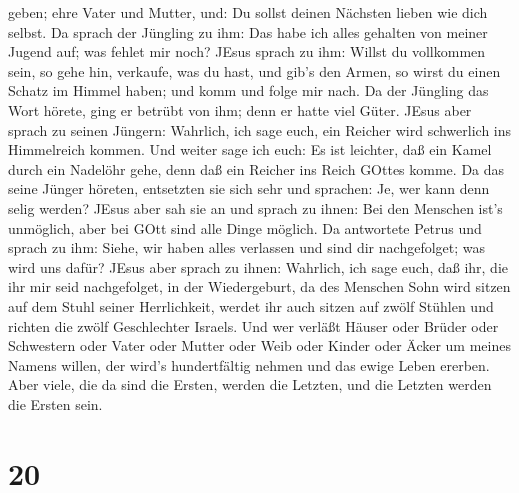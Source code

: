 geben;  ehre Vater und Mutter, und: Du sollst deinen
Nächsten lieben wie dich selbst.  Da sprach der Jüngling zu
ihm: Das habe ich alles gehalten von meiner Jugend auf; was fehlet mir
noch?  JEsus sprach zu ihm: Willst du vollkommen sein, so
gehe hin, verkaufe, was du hast, und gib's den Armen, so wirst du einen
Schatz im Himmel haben; und komm und folge mir nach.  Da
der Jüngling das Wort hörete, ging er betrübt von ihm; denn er hatte
viel Güter.  JEsus aber sprach zu seinen Jüngern: Wahrlich,
ich sage euch, ein Reicher wird schwerlich ins Himmelreich kommen.
 Und weiter sage ich euch: Es ist leichter, daß ein Kamel
durch ein Nadelöhr gehe, denn daß ein Reicher ins Reich GOttes komme.
 Da das seine Jünger höreten, entsetzten sie sich sehr und
sprachen: Je, wer kann denn selig werden?  JEsus aber sah
sie an und sprach zu ihnen: Bei den Menschen ist's unmöglich, aber bei
GOtt sind alle Dinge möglich.  Da antwortete Petrus und
sprach zu ihm: Siehe, wir haben alles verlassen und sind dir
nachgefolget; was wird uns dafür?  JEsus aber sprach zu
ihnen: Wahrlich, ich sage euch, daß ihr, die ihr mir seid nachgefolget,
in der Wiedergeburt, da des Menschen Sohn wird sitzen auf dem Stuhl
seiner Herrlichkeit, werdet ihr auch sitzen auf zwölf Stühlen und
richten die zwölf Geschlechter Israels.  Und wer verläßt
Häuser oder Brüder oder Schwestern oder Vater oder Mutter oder Weib oder
Kinder oder Äcker um meines Namens willen, der wird's hundertfältig
nehmen und das ewige Leben ererben.  Aber viele, die da
sind die Ersten, werden die Letzten, und die Letzten werden die Ersten
sein.

\hypertarget{section-19}{%
\section{20}\label{section-19}}

